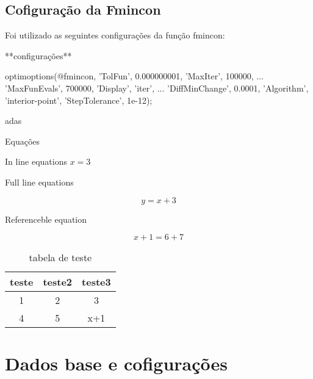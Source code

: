     
    
    
    
    
    


\subsection{Cofiguração da Fmincon}
Foi utilizado as seguintes configurações da função fmincon:

**configurações**

optimoptions(@fmincon, 'TolFun', 0.000000001, 'MaxIter', 100000, ...
                       'MaxFunEvals', 700000, 'Display', 'iter', ...
                       'DiffMinChange', 0.0001, 'Algorithm', 'interior-point', 'StepTolerance', 1e-12);

adas


Equações

In line equations $x = 3$

Full line equations

$$y = x+3$$

Referenceble equation

\begin{equation}
\label{eq:teste}
x+1 = 6+7
\end{equation}

\begin{table}
    \begin{center}
    \caption{tabela de teste}
    \label{tab:teste}
    \begin{tabular}{c c c}
        teste & teste2 & teste3 \\ \hline
        1 & 2 & 3 \\
        4 & 5 & x+1 \\ \hline
    \end{tabular}
    \end{center}
\end{table}
                       

\section{Dados base e cofigurações}

